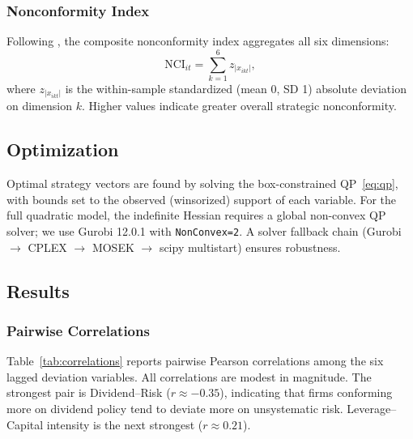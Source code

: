 \documentclass[12pt]{article}
\begin{document}
\subsubsection{Nonconformity Index}

Following \citet{miller2013}, the composite nonconformity index aggregates all six dimensions:
\begin{equation}
    \text{NCI}_{it} = \sum_{k=1}^{6} z_{|x_{ikt}|},
    \label{eq:nci}
\end{equation}
where $z_{|x_{ikt}|}$ is the within-sample standardized (mean 0, SD 1) absolute deviation on dimension $k$. Higher values indicate greater overall strategic nonconformity.

\subsection{Optimization}
\label{sec:optimization}

Optimal strategy vectors are found by solving the box-constrained QP~\eqref{eq:qp}, with bounds set to the observed (winsorized) support of each variable. For the full quadratic model, the indefinite Hessian requires a global non-convex QP solver; we use Gurobi 12.0.1 with \texttt{NonConvex=2}. A solver fallback chain (Gurobi $\to$ CPLEX $\to$ MOSEK $\to$ scipy multistart) ensures robustness.


\subsection{Results}
\label{sec:results}

\subsubsection{Pairwise Correlations}

Table~\ref{tab:correlations} reports pairwise Pearson correlations among the six lagged deviation variables. All correlations are modest in magnitude. The strongest pair is Dividend--Risk ($r \approx -0.35$), indicating that firms conforming more on dividend policy tend to deviate more on unsystematic risk. Leverage--Capital intensity is the next strongest ($r \approx 0.21$).
\end{document}
